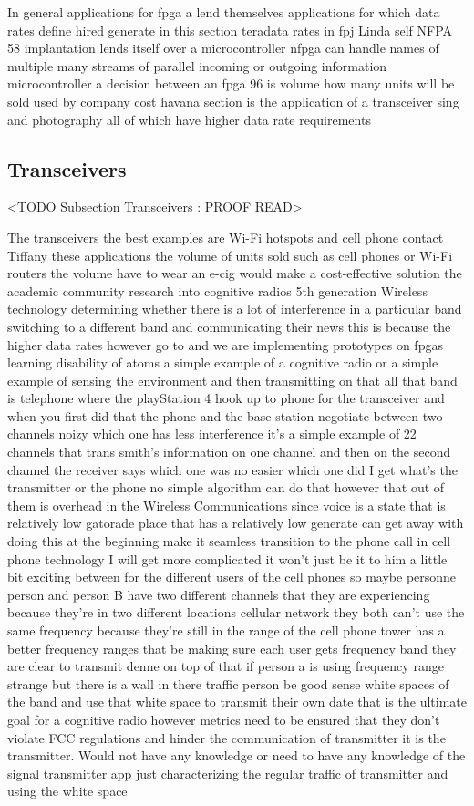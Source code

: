 In general applications for fpga a lend themselves applications for which data rates define hired generate in this section teradata rates in fpj Linda self NFPA 58 implantation lends itself over a microcontroller nfpga can handle names of multiple many streams of parallel incoming or outgoing information microcontroller a decision between an fpga 96 is volume how many units will be sold used by company cost havana section is the application of a transceiver sing and photography all of which have higher data rate requirements

\subsection{Transceivers}
	<TODO Subsection Transceivers : PROOF READ>

The transceivers the best examples are Wi-Fi hotspots and cell phone contact Tiffany these applications the volume of units sold such as cell phones or Wi-Fi routers the volume have to wear an e-cig would make a cost-effective solution the academic community research into cognitive radios 5th generation Wireless technology determining whether there is a lot of interference in a particular band switching to a different band and communicating their news this is because the higher data rates however go to and we are implementing prototypes on fpgas learning disability of atoms a simple example of a cognitive radio or a simple example of sensing the environment and then transmitting on that all that band is telephone where the playStation 4 hook up to phone for the transceiver and when you first did that the phone and the base station negotiate between two channels noizy which one has less interference it's a simple example of 22 channels that trans smith's information on one channel and then on the second channel the receiver says which one was no easier which one did I get what's the transmitter or the phone no simple algorithm can do that however that out of them is overhead in the Wireless Communications since voice is a state that is relatively low gatorade place that has a relatively low generate can get away with doing this at the beginning make it seamless transition to the phone call in cell phone technology I will get more complicated it won't just be it to him a little bit exciting between for the different users of the cell phones so maybe personne person and person B have two different channels that they are experiencing because they're in two different locations cellular network they both can't use the same frequency because they're still in the range of the cell phone tower has a better frequency ranges that be making sure each user gets frequency band they are clear to transmit denne on top of that if person a is using frequency range strange but there is a wall in there traffic person be good sense white spaces of the band and use that white space to transmit their own date that is the ultimate goal for a cognitive radio however metrics need to be ensured that they don't violate FCC regulations and hinder the communication of transmitter it is the transmitter. Would not have any knowledge or need to have any knowledge of the signal transmitter app just characterizing the regular traffic of transmitter and using the white space 